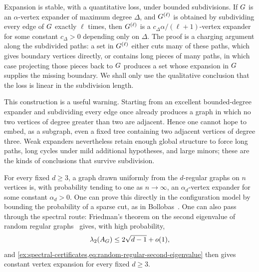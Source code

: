 \begin{example}
	\label{ex:subdivision-expander}
	Expansion is stable, with a quantitative loss, under bounded subdivisions. If \(G\) is an \(\alpha\)-vertex expander of maximum degree \(\Delta\), and \(G^{(\ell)}\) is obtained by subdividing every edge of \(G\) exactly \(\ell\) times, then \(G^{(\ell)}\) is a \(c_{\Delta}\alpha/(\ell+1)\)-vertex expander for some constant \(c_{\Delta}>0\) depending only on \(\Delta\). The proof is a charging argument along the subdivided paths: a set in \(G^{(\ell)}\) either cuts many of these paths, which gives boundary vertices directly, or contains long pieces of many paths, in which case projecting those pieces back to \(G\) produces a set whose expansion in \(G\) supplies the missing boundary. We shall only use the qualitative conclusion that the loss is linear in the subdivision length.

	This construction is a useful warning. Starting from an excellent bounded-degree expander and subdividing every edge once already produces a graph in which no two vertices of degree greater than two are adjacent. Hence one cannot hope to embed, as a subgraph, even a fixed tree containing two adjacent vertices of degree three. Weak expanders nevertheless retain enough global structure to force long paths, long cycles under mild additional hypotheses, and large minors; these are the kinds of conclusions that survive subdivision.
\end{example}

\begin{example}
	\label{ex:random-regular-expanders}
	For every fixed \(d\geq 3\), a graph drawn uniformly from the \(d\)-regular graphs on \(n\) vertices is, with probability tending to one as \(n\to\infty\), an \(\alpha_d\)-vertex expander for some constant \(\alpha_d>0\). One can prove this directly in the configuration model by bounding the probability of a sparse cut, as in Bollobas~\cite{Bol1988}. One can also pass through the spectral route: Friedman's theorem on the second eigenvalue of random regular graphs~\cite{STOC:Friedman03} gives, with high probability,
	\begin{equation}
		\label{eq:random-regular-second-eigenvalue}
		\lambda_2(A_{G})\leq 2\sqrt{d-1}+o(1),
	\end{equation}
	and \cref{ex:spectral-certificates,eq:random-regular-second-eigenvalue} then gives constant vertex expansion for every fixed \(d\geq 3\).
\end{example}

